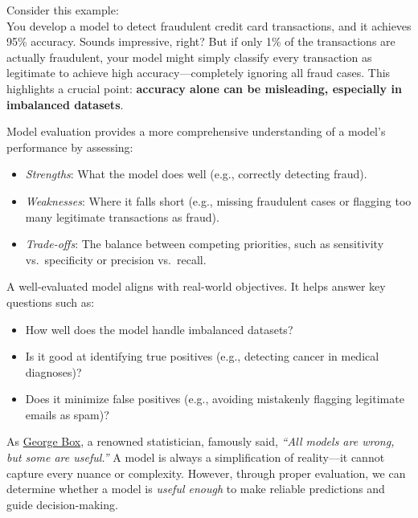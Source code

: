 \documentclass[
  11pt,
]{book}
\providecommand{\tightlist}{%
  \setlength{\itemsep}{0pt}\setlength{\parskip}{0pt}}
\theoremstyle{definition}
\theoremstyle{definition}
\theoremstyle{definition}
\theoremstyle{definition}
\theoremstyle{remark}
\begin{document}
Consider this example:\\
You develop a model to detect fraudulent credit card transactions, and it achieves 95\% accuracy. Sounds impressive, right? But if only 1\% of the transactions are actually fraudulent, your model might simply classify every transaction as legitimate to achieve high accuracy---completely ignoring all fraud cases. This highlights a crucial point: \textbf{accuracy alone can be misleading, especially in imbalanced datasets}.

Model evaluation provides a more comprehensive understanding of a model's performance by assessing:

\begin{itemize}
\tightlist
\item
  \emph{Strengths}: What the model does well (e.g., correctly detecting fraud).\\
\item
  \emph{Weaknesses}: Where it falls short (e.g., missing fraudulent cases or flagging too many legitimate transactions as fraud).\\
\item
  \emph{Trade-offs}: The balance between competing priorities, such as sensitivity vs.~specificity or precision vs.~recall.
\end{itemize}

A well-evaluated model aligns with real-world objectives. It helps answer key questions such as:

\begin{itemize}
\tightlist
\item
  How well does the model handle imbalanced datasets?\\
\item
  Is it good at identifying true positives (e.g., detecting cancer in medical diagnoses)?\\
\item
  Does it minimize false positives (e.g., avoiding mistakenly flagging legitimate emails as spam)?
\end{itemize}

As \href{https://en.wikipedia.org/wiki/George_E._P._Box}{George Box}, a renowned statistician, famously said, \emph{``All models are wrong, but some are useful.''} A model is always a simplification of reality---it cannot capture every nuance or complexity. However, through proper evaluation, we can determine whether a model is \emph{useful enough} to make reliable predictions and guide decision-making.
\end{document}
